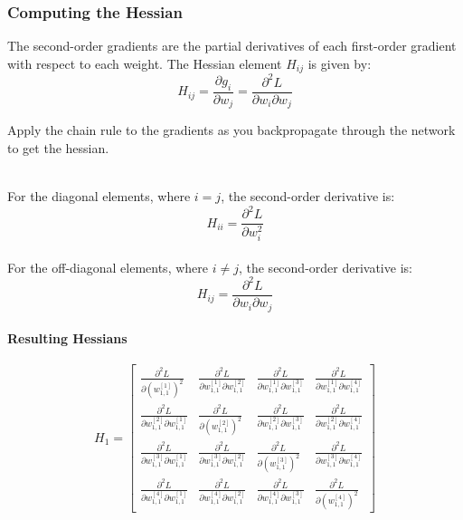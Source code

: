 \documentclass{article}
\begin{document}
\subsubsection{Computing the Hessian}

The second-order gradients are the partial derivatives of each first-order gradient with respect to each weight. The Hessian element \( H_{ij} \) is given by:
\[
H_{ij} = \frac{\partial g_i}{\partial w_j} = \frac{\partial^2 L}{\partial w_i \partial w_j}
\]

Apply the chain rule to the gradients as you backpropagate through the network to get the hessian.

\\
For the diagonal elements, where \( i = j \), the second-order derivative is:
\[
H_{ii} = \frac{\partial^2 L}{\partial w_i^2}
\]
\\
For the off-diagonal elements, where \( i \neq j \), the second-order derivative is:
\[
H_{ij} = \frac{\partial^2 L}{\partial w_i \partial w_j}
\]

\paragraph{Resulting Hessians}

\[
H_1 = \begin{bmatrix}
\frac{\partial^2 L}{\partial (w_{1,1}^{[1]})^2} & \frac{\partial^2 L}{\partial w_{1,1}^{[1]} \partial w_{1,1}^{[2]}} & \frac{\partial^2 L}{\partial w_{1,1}^{[1]} \partial w_{1,1}^{[3]}} & \frac{\partial^2 L}{\partial w_{1,1}^{[1]} \partial w_{1,1}^{[4]}} \\
\frac{\partial^2 L}{\partial w_{1,1}^{[2]} \partial w_{1,1}^{[1]}} & \frac{\partial^2 L}{\partial (w_{1,1}^{[2]})^2} & \frac{\partial^2 L}{\partial w_{1,1}^{[2]} \partial w_{1,1}^{[3]}} & \frac{\partial^2 L}{\partial w_{1,1}^{[2]} \partial w_{1,1}^{[4]}} \\
\frac{\partial^2 L}{\partial w_{1,1}^{[3]} \partial w_{1,1}^{[1]}} & \frac{\partial^2 L}{\partial w_{1,1}^{[3]} \partial w_{1,1}^{[2]}} & \frac{\partial^2 L}{\partial (w_{1,1}^{[3]})^2} & \frac{\partial^2 L}{\partial w_{1,1}^{[3]} \partial w_{1,1}^{[4]}} \\
\frac{\partial^2 L}{\partial w_{1,1}^{[4]} \partial w_{1,1}^{[1]}} & \frac{\partial^2 L}{\partial w_{1,1}^{[4]} \partial w_{1,1}^{[2]}} & \frac{\partial^2 L}{\partial w_{1,1}^{[4]} \partial w_{1,1}^{[3]}} & \frac{\partial^2 L}{\partial (w_{1,1}^{[4]})^2}
\end{bmatrix}
\]
\end{document}
